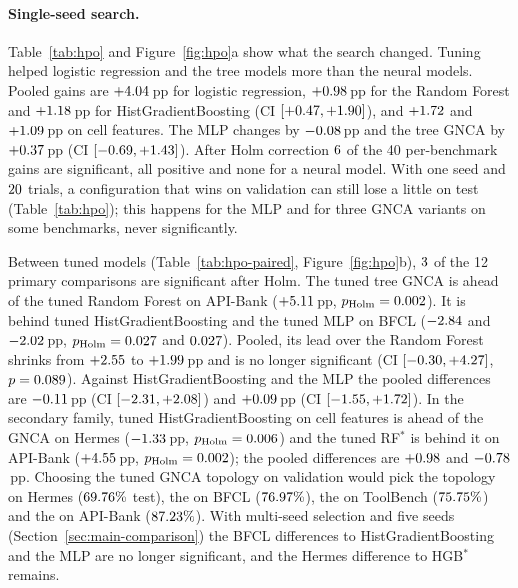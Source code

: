 \documentclass[10pt,twocolumn,letterpaper]{article}
\begin{document}
\paragraph{Single-seed search.} Table~\ref{tab:hpo} and Figure~\ref{fig:hpo}a show what the search changed. Tuning helped logistic regression and the tree models more than the neural models. Pooled gains are $+4.04$\,pp for logistic regression, $+0.98$\,pp for the Random Forest and $+1.18$\,pp for HistGradientBoosting (CI $[+0.47, +1.90]$), and $+1.72$ and $+1.09$\,pp on cell features. The MLP changes by $-0.08$\,pp and the tree GNCA by $+0.37$\,pp (CI $[-0.69, +1.43]$). After Holm correction $6$ of the 40 per-benchmark gains are significant, all positive and none for a neural model. With one seed and $20$ trials, a configuration that wins on validation can still lose a little on test (Table~\ref{tab:hpo}); this happens for the MLP and for three GNCA variants on some benchmarks, never significantly.

Between tuned models (Table~\ref{tab:hpo-paired}, Figure~\ref{fig:hpo}b), $3$ of the 12 primary comparisons are significant after Holm. The tuned tree GNCA is ahead of the tuned Random Forest on API-Bank ($+5.11$\,pp, $p_{\text{Holm}}=0.002$). It is behind tuned HistGradientBoosting and the tuned MLP on BFCL ($-2.84$ and $-2.02$\,pp, $p_{\text{Holm}}=0.027$ and $0.027$). Pooled, its lead over the Random Forest shrinks from $+2.55$ to $+1.99$\,pp and is no longer significant (CI $[-0.30, +4.27]$, $p=0.089$). Against HistGradientBoosting and the MLP the pooled differences are $-0.11$\,pp (CI $[-2.31, +2.08]$) and $+0.09$\,pp (CI $[-1.55, +1.72]$). In the secondary family, tuned HistGradientBoosting on cell features is ahead of the GNCA on Hermes ($-1.33$\,pp, $p_{\text{Holm}}=0.006$) and the tuned RF$^\ast$ is behind it on API-Bank ($+4.55$\,pp, $p_{\text{Holm}}=0.002$); the pooled differences are $+0.98$ and $-0.78$\,pp. Choosing the tuned GNCA topology on validation would pick the \numTVsHerModel{} topology on Hermes ($69.76\%$ test), the \numTVsBfclModel{} on BFCL ($76.97\%$), the \numTVsTbModel{} on ToolBench ($75.75\%$) and the \numTVsAbModel{} on API-Bank ($87.23\%$). With multi-seed selection and five seeds (Section~\ref{sec:main-comparison}) the BFCL differences to HistGradientBoosting and the MLP are no longer significant, and the Hermes difference to HGB$^\ast$ remains.
\end{document}
